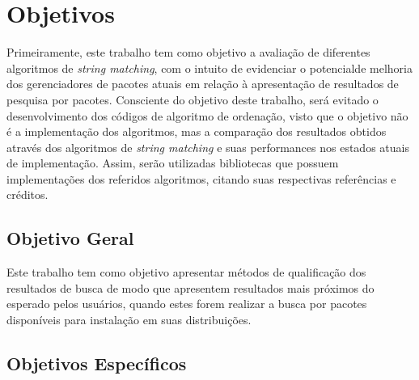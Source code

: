 \chapter{\nmu Objetivos}
\label{cha:objetivos}

Primeiramente, este trabalho tem como objetivo a avaliação de diferentes algoritmos de \textit{string matching}, com o intuito de evidenciar o potencialde melhoria dos gerenciadores de pacotes atuais em relação à apresentação de resultados de pesquisa por pacotes. Consciente do objetivo deste trabalho, será evitado o desenvolvimento dos códigos de algoritmo de ordenação, visto que o objetivo não é a implementação dos algoritmos, mas a comparação dos resultados obtidos através dos algoritmos de \textit{string matching} e suas performances nos estados atuais de implementação. Assim, serão utilizadas bibliotecas que possuem implementações dos referidos algoritmos, citando suas respectivas referências e créditos.

\section{Objetivo Geral}

Este trabalho tem como objetivo apresentar  métodos de qualificação dos resultados de busca de modo que apresentem resultados mais próximos do esperado pelos usuários, quando estes forem realizar a busca por pacotes disponíveis para instalação em suas distribuições.

\section{Objetivos Específicos}


